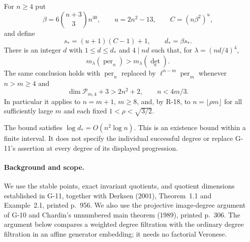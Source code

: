 \begin{proposition}\label{G-13}
For $n\geq4$ put
\[
 \beta=6\binom{n+3}{3}n^{30},\qquad u=2n^2-13,\qquad
 C=(n\beta^2)^u,
\]
and define
\begin{equation}\label{G13:first-bound}
 s_*=(u+1)(C-1)+1,\qquad d_* = \beta s_*.
\end{equation}
There is an integer $d$ with $1\leq d\leq d_*$ and $4\mid nd$
such that, for $\lambda=(nd/4)^4$,
\[
 m_\lambda(\operatorname{per}_n)>m_\lambda(\det_n).
\]
The same conclusion holds with $\operatorname{per}_n$ replaced by
$\ell^{n-m}\operatorname{per}_m$ whenever $n>m\geq4$ and
\[
 \dim\mathcal P_{m,4}+3>2n^2+2,
 \qquad n<4m/3.
\]
In particular it applies to $n=m+1$, $m\geq8$, and, by R-18,
to $n=\lfloor\rho m\rfloor$ for all sufficiently large $m$
and each fixed $1<\rho<\sqrt{3/2}$.

The bound satisfies $\log d_*=O(n^2\log n)$. This is an
existence bound within a finite interval. It does not specify
the individual successful degree or replace G-11's assertion
at every degree of its displayed progression.
\end{proposition}

\paragraph{Background and scope.}
We use the stable points, exact invariant quotients, and quotient
dimensions established in G-11, together with Derksen (2001),
Theorem~1.1 and Example~2.1, printed p.~956. We also use the
projective image-degree argument of G-10 and Chardin's
unnumbered main theorem (1989), printed p.~306. The argument
below compares a weighted degree filtration with the ordinary
degree filtration in an affine generator embedding; it needs
no factorial Veronese.

